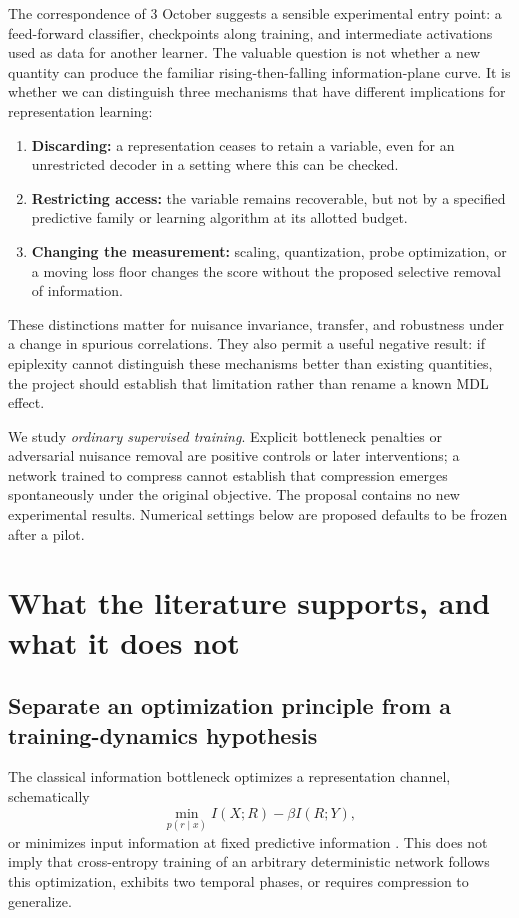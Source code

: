 \documentclass[11pt,a4paper]{article}
\begin{document}
The correspondence of 3 October suggests a sensible experimental entry point: a feed-forward classifier, checkpoints along training, and intermediate activations used as data for another learner. The valuable question is not whether a new quantity can produce the familiar rising-then-falling information-plane curve. It is whether we can distinguish three mechanisms that have different implications for representation learning:
\begin{enumerate}
\item \textbf{Discarding:} a representation ceases to retain a variable, even for an unrestricted decoder in a setting where this can be checked.
\item \textbf{Restricting access:} the variable remains recoverable, but not by a specified predictive family or learning algorithm at its allotted budget.
\item \textbf{Changing the measurement:} scaling, quantization, probe optimization, or a moving loss floor changes the score without the proposed selective removal of information.
\end{enumerate}
These distinctions matter for nuisance invariance, transfer, and robustness under a change in spurious correlations. They also permit a useful negative result: if epiplexity cannot distinguish these mechanisms better than existing quantities, the project should establish that limitation rather than rename a known MDL effect.

We study \emph{ordinary supervised training}. Explicit bottleneck penalties or adversarial nuisance removal are positive controls or later interventions; a network trained to compress cannot establish that compression emerges spontaneously under the original objective. The proposal contains no new experimental results. Numerical settings below are proposed defaults to be frozen after a pilot.

\section{What the literature supports, and what it does not}

\subsection{Separate an optimization principle from a training-dynamics hypothesis}
The classical information bottleneck optimizes a representation channel, schematically
\begin{equation}
\min_{p(r\mid x)} I(X;R)-\beta I(R;Y),
\label{eq:ib}
\end{equation}
or minimizes input information at fixed predictive information \citep{tishby1999}. This does not imply that cross-entropy training of an arbitrary deterministic network follows this optimization, exhibits two temporal phases, or requires compression to generalize.
\end{document}
